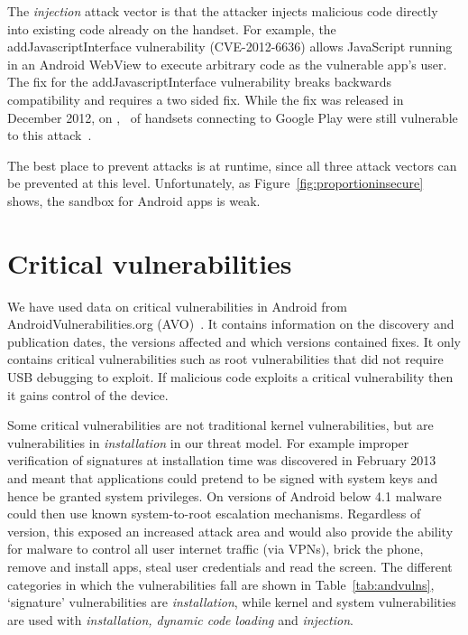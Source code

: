 \documentclass{sig-alternate-2013}
\newcommand{\avo}{AVO}
\begin{document}
The \emph{injection} attack vector is that the attacker injects malicious code directly into existing code already on the handset. 
For example, the addJavascriptInterface vulnerability (CVE-2012-6636) allows JavaScript running in an Android WebView to execute arbitrary code as the vulnerable app's user.
The fix for the addJavascriptInterface vulnerability breaks backwards compatibility and requires a two sided fix.
While the fix was released in December 2012, on \daGPAPISeventeenLaterDate, \daGPAPISeventeenEarlierProportion\ of handsets connecting to Google Play were still vulnerable to this attack~\cite{Thomas2015a}.

The best place to prevent attacks is at runtime, since all three attack vectors can be prevented at this level. 
Unfortunately, as Figure~\ref{fig:proportioninsecure} shows, the sandbox for Android apps is weak.


\section{Critical vulnerabilities}
We have used data on critical vulnerabilities in Android from AndroidVulnerabilities.org (\avo)~\cite{androidvulnerabilities.org}.
It contains information on the discovery and publication dates, the versions affected and which versions contained fixes.
It only contains critical vulnerabilities such as root vulnerabilities that did not require USB debugging to exploit.
If malicious code exploits a critical vulnerability then it gains control of the device.

Some critical vulnerabilities are not traditional kernel vulnerabilities, but are vulnerabilities in \emph{installation} in our threat model.
For example improper verification of signatures at installation time was discovered in February 2013~\cite{Forristal2013} and meant that applications could pretend to be signed with system keys and hence be granted system privileges.
On versions of Android below 4.1 malware could then use known system-to-root escalation mechanisms.
Regardless of version, this exposed an increased attack area and would also provide the ability for malware to control all user internet traffic (via VPNs), brick the phone, remove and install apps, steal user credentials and read the screen.
The different categories in which the vulnerabilities fall are shown in Table~\ref{tab:andvulns}, `signature' vulnerabilities are \emph{installation}, while kernel and system vulnerabilities are used with \emph{installation, dynamic code loading} and \emph{injection}.
\avoTabAndVulns
\end{document}
